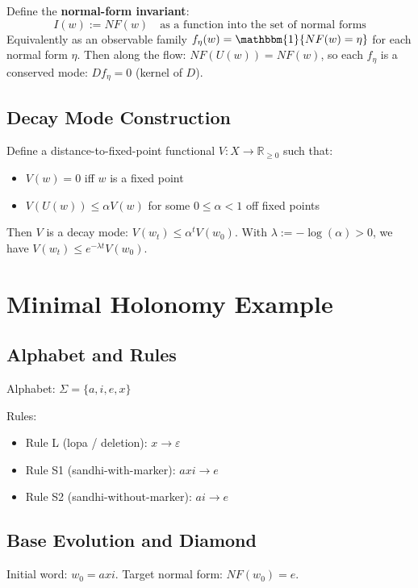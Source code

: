 \documentclass[12pt, oneside]{article}
\begin{document}
Define the \textbf{normal-form invariant}:
\begin{equation}
I(w) := NF(w) \quad \text{as a function into the set of normal forms}
\end{equation}
Equivalently as an observable family $f_\eta(w) = \mathbbm{1}\{NF(w) = \eta\}$ for each normal form $\eta$. Then along the flow: $NF(U(w)) = NF(w)$, so each $f_\eta$ is a conserved mode: $Df_\eta = 0$ (kernel of $D$).

\subsection{Decay Mode Construction}

Define a distance-to-fixed-point functional $V: X \rightarrow \mathbb{R}_{\geq 0}$ such that:
\begin{itemize}
    \item $V(w) = 0$ iff $w$ is a fixed point
    \item $V(U(w)) \leq \alpha V(w)$ for some $0 \leq \alpha < 1$ off fixed points
\end{itemize}
Then $V$ is a decay mode: $V(w_t) \leq \alpha^t V(w_0)$. With $\lambda := -\log(\alpha) > 0$, we have $V(w_t) \leq e^{-\lambda t} V(w_0)$.

\section{Minimal Holonomy Example}

\subsection{Alphabet and Rules}

Alphabet: $\Sigma = \{a, i, e, x\}$

Rules:
\begin{itemize}
    \item Rule L (lopa / deletion): $x \to \varepsilon$
    \item Rule S1 (sandhi-with-marker): $a x i \to e$
    \item Rule S2 (sandhi-without-marker): $a i \to e$
\end{itemize}

\subsection{Base Evolution and Diamond}

Initial word: $w_0 = axi$. Target normal form: $NF(w_0) = e$.
\end{document}
